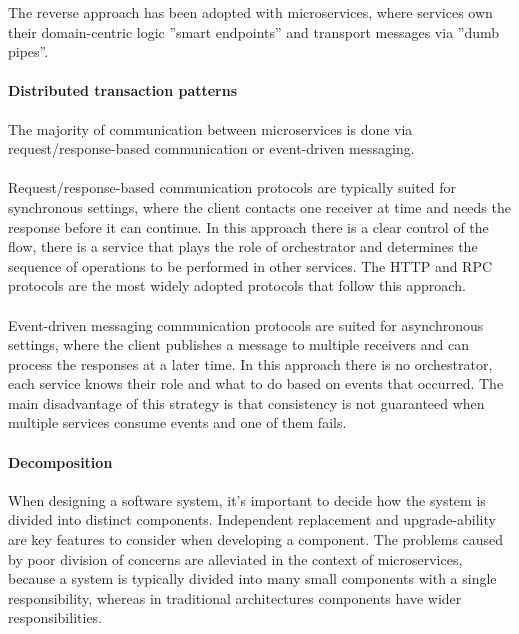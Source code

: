 The reverse approach has been adopted with microservices,
where services own their domain-centric logic ''smart endpoints'' and transport messages via ''dumb pipes''.

\paragraph{Distributed transaction patterns}
The majority of communication between microservices is done via request/response-based communication or event-driven messaging.

\paragraph{}

Request/response-based communication protocols are typically suited for synchronous settings,
where the client contacts one receiver at time and needs the response before it can continue.
In this approach there is a clear control of the flow,
there is a service that plays the role of orchestrator and determines the sequence of operations to be performed in other services.
The HTTP and RPC protocols are the most widely adopted protocols that follow this approach.

\paragraph{}

Event-driven messaging communication protocols are suited for asynchronous settings,
where the client publishes a message to multiple receivers and can process the responses at a later time.
In this approach there is no orchestrator, each service knows their role and what to do based on events that occurred.
The main disadvantage of this strategy is that consistency is not guaranteed when multiple services consume events and one of them fails.

\paragraph{Decomposition}
When designing a software system, it's important to decide how the system is divided into distinct components.
Independent replacement and upgrade-ability are key features to consider when developing a component.
The problems caused by poor division of concerns are alleviated in the context of microservices, because a system is typically divided into many small components with a single responsibility,
whereas in traditional architectures components have wider responsibilities.

